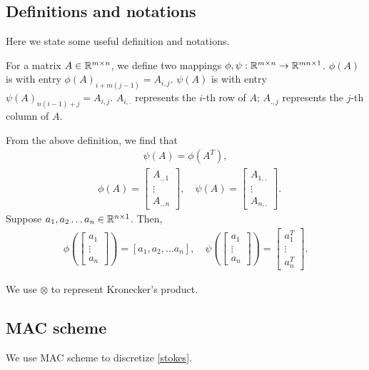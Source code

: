 \documentclass[english]{pkupaper}
\newenvironment{eqt}{\begin{equation}\begin{aligned}}{\end{aligned}\end{equation}}
\begin{document}
\subsection{Definitions and notations}
Here we state some useful definition and notations.
\begin{definition}
For a matrix $A\in \mathbb{R}^{m\times n}$, we define two mappings $\phi, \psi: \mathbb{R}^{m\times n}\to \mathbb{R}^{mn\times 1}$. $\phi(A)$ is with entry $\phi(A)_{i+m(j-1)}=A_{i,j}$. $\psi(A)$ is with entry $\psi(A)_{n(i-1)+j}=A_{i,j}$. 
$A_{i,.}$ represents the $i$-th row of $A$; $A_{.,j}$ represents the $j$-th column of $A$. 
\end{definition}
From the above definition, we find that 
\begin{eqt}
\psi(A)=\phi(A^T),
\end{eqt} 
\begin{eqt}
&\phi(A)=\begin{bmatrix}
A_{.,1}\\
 \vdots \\
 A_{.,n}
\end{bmatrix},\quad \psi(A)=\begin{bmatrix}
A_{1,.}\\
 \vdots \\
 A_{n,.}
\end{bmatrix}.
\end{eqt}
Suppose $a_1, a_2 \dots a_n \in\mathbb{R}^{n\times 1}$. Then, 
\begin{eqt}
\phi(\begin{bmatrix}
a_1\\
 \vdots \\
a_n
\end{bmatrix})=[a_1, a_2, \dots a_n],\quad \psi(\begin{bmatrix}
a_1\\
 \vdots \\
a_n
\end{bmatrix})=\begin{bmatrix}
a_1^T\\
 \vdots \\
a_n^T
\end{bmatrix}.
\end{eqt}

We use $\otimes$ to represent Kronecker’s product.
\subsection{MAC scheme}
We use MAC scheme to discretize \ref{stokes}. 
\end{document}
